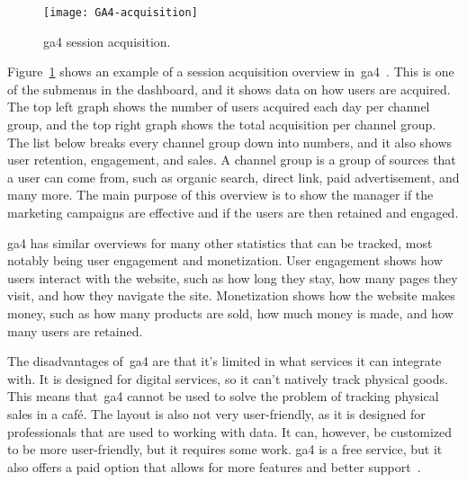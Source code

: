 \begin{figure}[H]
    \centering
    \texttt{[image: GA4-acquisition]}
    \caption{\acrshort{ga4} session acquisition.
    }\label{fig:GA4-acquisition}
\end{figure}

Figure~\ref{fig:GA4-acquisition} shows an example of a session acquisition overview in~\acrshort{ga4}~\cite{ga4-tips}.
This is one of the submenus in the dashboard, and it shows data on how users are acquired.
The top left graph shows the number of users acquired each day per channel group, and the top right graph shows the
total acquisition per channel group.
The list below breaks every channel group down into numbers, and it also shows user retention, engagement, and sales.
A channel group is a group of sources that a user can come from, such as organic search, direct link, paid
advertisement, and many more.
The main purpose of this overview is to show the manager if the marketing campaigns are effective and if the users are
then retained and engaged.

\acrshort{ga4} has similar overviews for many other statistics that can be tracked, most notably being user engagement
and monetization.
User engagement shows how users interact with the website, such as how long they stay, how many pages they visit, and
how they navigate the site.
Monetization shows how the website makes money, such as how many products are sold, how much money is made, and how
many users are retained.

The disadvantages of~\acrlong{ga4} are that it's limited in what services it can integrate with.
It is designed for digital services, so it can't natively track physical goods.
This means that~\acrshort{ga4} cannot be used to solve the problem of tracking physical sales in a café.
The layout is also not very user-friendly, as it is designed for professionals that are used to working with data.
It can, however, be customized to be more user-friendly, but it requires some work.
\acrshort{ga4} is a free service, but it also offers a paid option that allows for more features and better
support~\cite{ga4-360}.
